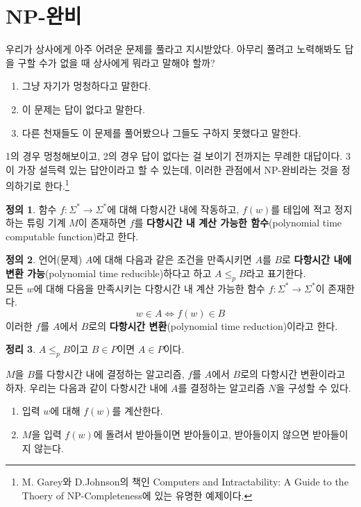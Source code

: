 \documentclass[b5paper, 10pt]{book}
\theoremstyle{definition}
\newtheorem{defn}{정의}[chapter]
\newtheorem{thm}[defn]{정리}
\newenvironment{pf*}{\pushQED{\qed}\pf}{\popQED\endpf}
\begin{document}
\section{NP-완비}
우리가 상사에게 아주 어려운 문제를 풀라고 지시받았다. 아무리 풀려고 노력해봐도 답을 구할 수가 없을 때
상사에게 뭐라고 말해야 할까?
\begin{enumerate}
    \item 그냥 자기가 멍청하다고 말한다.
    \item 이 문제는 답이 없다고 말한다.
    \item 다른 천재들도 이 문제를 풀어봤으나 그들도 구하지 못했다고 말한다.
\end{enumerate}
1의 경우 멍청해보이고, 2의 경우 답이 없다는 걸 보이기 전까지는 무례한 대답이다. 3이 가장 설득력 있는
답안이라고 할 수 있는데, 이러한 관점에서 NP-완비라는 것을 정의하기로 한다.\footnote{M. Garey와 
D.Johnson의 책인 
Computers and Intractability: A Guide to the Thoery of NP-Completeness에 있는 유명한 예제이다.}
\begin{defn}
    함수 $f: \Sigma^* \rightarrow \Sigma^*$에 대해 다항시간 내에 작동하고, $f(w)$를 테입에 적고 정지하는 
    튜링 기계 $M$이 존재하면 $f$를 \textbf{다항시간 내 계산 가능한 함수}(polynomial
    time computable function)라고 한다.
\end{defn}
\begin{defn}
    언어(문제) $A$에 대해 다음과 같은 조건을 만족시키면 $A$를 $B$로 \textbf{다항시간 내에 변환 
    가능}(polynomial time reducible)하다고 하고 $A \le_p B$라고 표기한다. \\ 
    모든 $w$에 대해 다음을 만족시키는 다항시간 내 계산 가능한 함수 $f: \Sigma^* \rightarrow \Sigma^*$이
    존재한다.
    $$w \in A \Longleftrightarrow f(w) \in B$$
    이러한 $f$를 $A$에서 $B$로의 \textbf{다항시간 변환}(polynomial time reduction)이라고 한다. 
\end{defn}
\begin{thm}
    $A \le_p B$이고 $B \in P$이면 $A \in P$이다.
\end{thm}
\begin{pf*}
    $M$을 $B$를 다항시간 내에 결정하는 알고리즘, $f$를 $A$에서 $B$로의 다항시간 변환이라고 하자. 
    우리는 다음과 같이 다항시간 내에 $A$를 결정하는 알고리즘 $N$을 구성할 수 있다.
    \begin{enumerate}
        \item 입력 $w$에 대해 $f(w)$를 계산한다.
        \item $M$을 입력 $f(w)$에 돌려서 받아들이면 받아들이고, 받아들이지 않으면 받아들이지 않는다.
    \end{enumerate}
\end{pf*}
\end{document}
